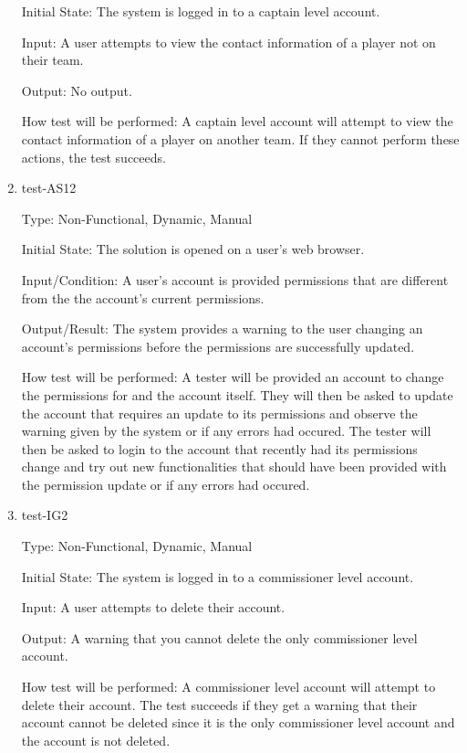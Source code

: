 \documentclass[12pt, titlepage]{article}
\begin{document}
\begin{enumerate}
  Initial State: The system is logged in to a captain level account.

  Input: A user attempts to view the contact information of a player not on
  their team.

  Output: No output.

  How test will be performed: A captain level account will attempt to view the
  contact information of a player on another team. If they cannot perform
  these actions, the test succeeds.

  \item{test-AS12\\}
  
  Type: Non-Functional, Dynamic, Manual
            
  Initial State: The solution is opened on a user's web browser.
            
  Input/Condition: A user's account is provided permissions that are different from the
  the account's current permissions.
            
  Output/Result: The system provides a warning to the user changing an account's
  permissions before the permissions are successfully updated.
            
  How test will be performed: A tester will be provided an account to change the
  permissions for and the account itself. They will then be asked to update the account
  that requires an update to its permissions and observe the warning given by the system
  or if any errors had occured. The tester will then be asked to login to the account
  that recently had its permissions change and try out new functionalities that should
  have been provided with the permission update or if any errors had occured.

  \item{test-IG2\\}

  Type: Non-Functional, Dynamic, Manual

  Initial State: The system is logged in to a commissioner level account.

  Input: A user attempts to delete their account.

  Output: A warning that you cannot delete the only commissioner level
  account.

  How test will be performed: A commissioner level account will attempt to
  delete their account. The test succeeds if they get a warning that their
  account cannot be deleted since it is the only commissioner level account
  and the account is not deleted.


\end{enumerate}
\end{document}
